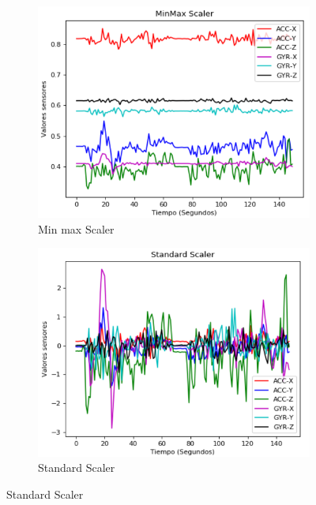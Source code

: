 \vspace{5mm} %

\begin{figure}
        \centering
        \begin{subfigure}[h]{0.45\textwidth} 
            \includegraphics[width=\textwidth]{imagenes/Cap3/min_max}
            \caption{Min max Scaler}
            \label{fig:min_max}
        \end{subfigure}       
        \begin{subfigure}[h]{0.45\textwidth} 
            \includegraphics[width=\textwidth]{imagenes/Cap3/standard}
            \caption{Standard Scaler}
            \label{fig:standard}
        \end{subfigure}
        

\end{figure}

